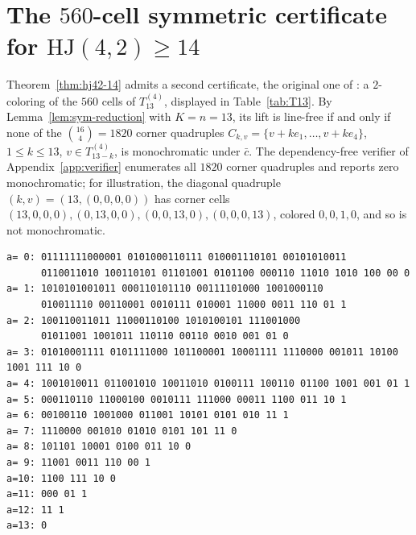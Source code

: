 \documentclass[12pt]{article}
\newcommand{\HJ}{\mathrm{HJ}}
\begin{document}
\appendix

\section{The \texorpdfstring{$560$}{560}-cell symmetric certificate for
\texorpdfstring{$\HJ(4,2)\ge 14$}{HJ(4,2) >= 14}}\label{app:table42}

Theorem~\ref{thm:hj42-14} admits a second certificate, the original one
of \cite{mh}: a $2$-coloring of the $560$ cells of $T_{13}^{(4)}$,
displayed in Table~\ref{tab:T13}. By Lemma~\ref{lem:sym-reduction} with
$K=n=13$, its lift is line-free if and only if none of the
$\binom{16}{4}=1820$ corner quadruples
$C_{k,v}=\{v+ke_{1},\dots,v+ke_{4}\}$, $1\le k\le 13$,
$v\in T_{13-k}^{(4)}$, is monochromatic under $\bar c$. The
dependency-free verifier of Appendix~\ref{app:verifier} enumerates all
$1820$ corner quadruples and reports zero monochromatic; for
illustration, the diagonal quadruple $(k,v)=(13,(0,0,0,0))$ has corner
cells $(13,0,0,0),(0,13,0,0),(0,0,13,0),(0,0,0,13)$, colored
$0,0,1,0$, and so is not monochromatic.

\begin{table}[h]
\centering
\caption{The alternative witness for Theorem~\ref{thm:hj42-14}: a
$2$-coloring of $T_{13}^{(4)}$ ($560$ cells), displayed in $14$ slices.
Slice $a$ collects the cells with $a$ ones; within slice $a$, the
$b$-th string (counting from $b=0$) lists the colors
$\bar c(a,b,c,13-a-b-c)$ for $c=0,1,\dots,13-a-b$. The strings are
byte-identical to the table embedded in the verifier of
Appendix~\ref{app:verifier} and in \cite{hjcerts}.}
\label{tab:T13}
\begin{lstlisting}[style=plainstyle]
a= 0: 01111111000001 0101000110111 010001110101 00101010011
      0110011010 100110101 01101001 0101100 000110 11010 1010 100 00 0
a= 1: 1010101001011 000110101110 00111101000 1001000110
      010011110 00110001 0010111 010001 11000 0011 110 01 1
a= 2: 100110011011 11000110100 1010100101 111001000
      01011001 1001011 110110 00110 0010 001 01 0
a= 3: 01010001111 0101111000 101100001 10001111 1110000 001011 10100 1001 111 10 0
a= 4: 1001010011 011001010 10011010 0100111 100110 01100 1001 001 01 1
a= 5: 000110110 11000100 0010111 111000 00011 1100 011 10 1
a= 6: 00100110 1001000 011001 10101 0101 010 11 1
a= 7: 1110000 001010 01010 0101 101 11 0
a= 8: 101101 10001 0100 011 10 0
a= 9: 11001 0011 110 00 1
a=10: 1100 111 10 0
a=11: 000 01 1
a=12: 11 1
a=13: 0
\end{lstlisting}
\end{table}
\end{document}

